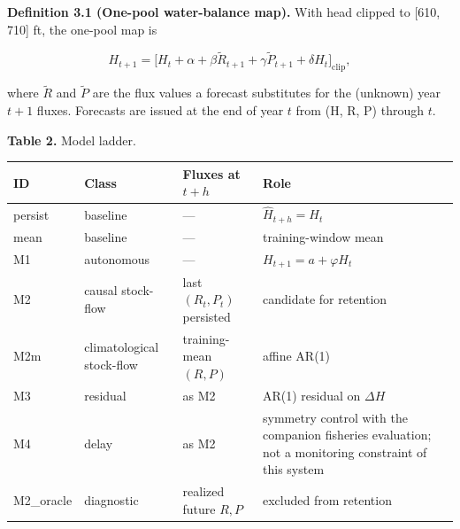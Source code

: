 \documentclass[11pt]{article}
\begin{document}
\textbf{Definition 3.1 (One-pool water-balance map).} With head clipped
to {[}610, 710{]} ft, the one-pool map is

\[H_{t+1}=\bigl[H_t+\alpha+\beta\tilde R_{t+1}+\gamma\tilde P_{t+1}+\delta H_t\bigr]_{\mathrm{clip}},\]

where \(\tilde R\) and \(\tilde P\) are the flux values a forecast
substitutes for the (unknown) year \(t+1\) fluxes. Forecasts are issued
at the end of year \(t\) from (H, R, P) through \(t\).

\textbf{Table 2.} Model ladder.

{\def\LTcaptype{none} %
\begin{longtable}[]{@{}
  >{\raggedright\arraybackslash}p{}
  >{\raggedright\arraybackslash}p{}
  >{\raggedright\arraybackslash}p{}
  >{\raggedright\arraybackslash}p{}@{}}
\toprule\noalign{}
\begin{minipage}[b]{\linewidth}\raggedright
ID
\end{minipage} & \begin{minipage}[b]{\linewidth}\raggedright
Class
\end{minipage} & \begin{minipage}[b]{\linewidth}\raggedright
Fluxes at \(t+h\)
\end{minipage} & \begin{minipage}[b]{\linewidth}\raggedright
Role
\end{minipage} \\
\midrule\noalign{}
\endhead
\bottomrule\noalign{}
\endlastfoot
persist & baseline & --- & \(\hat H_{t+h}=H_t\) \\
mean & baseline & --- & training-window mean \\
M1 & autonomous & --- & \(H_{t+1}=a+\varphi H_t\) \\
M2 & causal stock-flow & last \((R_t,P_t)\) persisted & candidate for
retention \\
M2m & climatological stock-flow & training-mean \((R,P)\) & affine
AR(1) \\
M3 & residual & as M2 & AR(1) residual on \(\Delta H\) \\
M4 & delay & as M2 & symmetry control with the companion fisheries
evaluation; not a monitoring constraint of this system \\
M2\_oracle & diagnostic & realized future \(R,P\) & excluded from
retention \\
\end{longtable}
}
\end{document}
